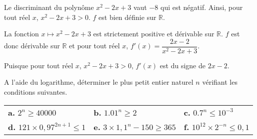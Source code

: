 \documentclass[11pt,fleqn, openany]{book} %
\begin{document}
\begin{solution}Le discriminant du polynôme $x^2-2x+3$ vaut $-8$ qui est négatif. Ainsi, pour tout réel $x$, $x^2-2x+3>0$. $f$ est bien définie sur $\mathbb{R}$.

La fonction $x\mapsto x^2-2x+3$ est strictement positive et dérivable sur $\mathbb{R}$. $f$ est donc dérivable sur $\mathbb{R}$ et pour tout réel $x$, $f'(x)=\dfrac{2x-2}{x^2-2x+3}$.

Puisque pour tout réel $x$, $x^2-2x+3>0$, $f'(x)$ est du signe de $2x-2$.

\begin{center}
\end{center}\end{solution}






\begin{exercise}A l'aide du logarithme, déterminer le plus petit entier naturel $n$ vérifiant les conditions suivantes.
\vspace{-0.5cm}
\begin{center}
\begin{tabularx}{0.9\linewidth}{XXX}
\textbf{a.} $2^n \geqslant 40000$ & \textbf{b.} $1.01^n \geqslant 2$ & \textbf{c.} $0.7^n \leqslant 10^{-3}$\\
\textbf{d.} $121 \times 0,97^{2n+1} \leqslant 1$ &\textbf{e.}  $3 \times 1,1^n -150 \geqslant 365$ & \textbf{f.} $ 10^{12}\times 2^{-n} \leqslant 0,1$
\end{tabularx}
\end{center}\end{exercise}
\end{document}
